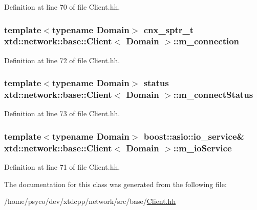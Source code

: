 Definition at line 70 of file Client.\+hh.

\subsubsection[{\texorpdfstring{m\+\_\+connection}{m_connection}}]{\setlength{\rightskip}{0pt plus 5cm}template$<$typename Domain$>$ {\bf cnx\+\_\+sptr\+\_\+t} {\bf xtd\+::network\+::base\+::\+Client}$<$ Domain $>$\+::m\+\_\+connection\hspace{0.3cm}{\ttfamily [protected]}}\hypertarget{classxtd_1_1network_1_1base_1_1Client_a9293a756af76e066790a1f389dbedb77}{}\label{classxtd_1_1network_1_1base_1_1Client_a9293a756af76e066790a1f389dbedb77}


Definition at line 72 of file Client.\+hh.

\subsubsection[{\texorpdfstring{m\+\_\+connect\+Status}{m_connectStatus}}]{\setlength{\rightskip}{0pt plus 5cm}template$<$typename Domain$>$ status {\bf xtd\+::network\+::base\+::\+Client}$<$ Domain $>$\+::m\+\_\+connect\+Status\hspace{0.3cm}{\ttfamily [protected]}}\hypertarget{classxtd_1_1network_1_1base_1_1Client_a99e6d675c7617cd6d8e94793d8af4871}{}\label{classxtd_1_1network_1_1base_1_1Client_a99e6d675c7617cd6d8e94793d8af4871}


Definition at line 73 of file Client.\+hh.

\subsubsection[{\texorpdfstring{m\+\_\+io\+Service}{m_ioService}}]{\setlength{\rightskip}{0pt plus 5cm}template$<$typename Domain$>$ boost\+::asio\+::io\+\_\+service\& {\bf xtd\+::network\+::base\+::\+Client}$<$ Domain $>$\+::m\+\_\+io\+Service\hspace{0.3cm}{\ttfamily [protected]}}\hypertarget{classxtd_1_1network_1_1base_1_1Client_ae3945e4771a207872ab45b73de2e040f}{}\label{classxtd_1_1network_1_1base_1_1Client_ae3945e4771a207872ab45b73de2e040f}


Definition at line 71 of file Client.\+hh.



The documentation for this class was generated from the following file\+:\begin{DoxyCompactItemize}
\item 
/home/psyco/dev/xtdcpp/network/src/base/\hyperlink{base_2Client_8hh}{Client.\+hh}\end{DoxyCompactItemize}
